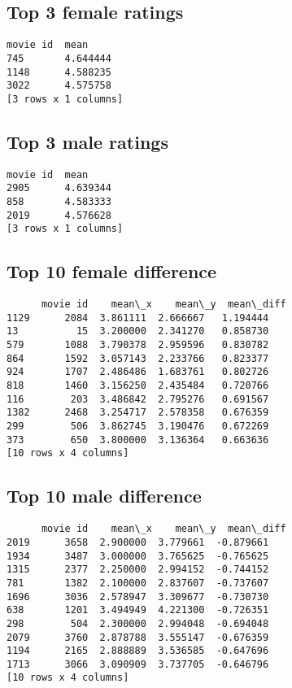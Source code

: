 \documentclass{article}
\begin{document}
\subsection{Top 3 female ratings}

\begin{verbatim}
movie id  mean
745       4.644444
1148      4.588235
3022      4.575758
[3 rows x 1 columns]
\end{verbatim}

\subsection{Top 3 male ratings}

\begin{verbatim}
movie id  mean
2905      4.639344
858       4.583333
2019      4.576628
[3 rows x 1 columns]
\end{verbatim}

\subsection{Top 10 female difference}

\begin{verbatim}
      movie id    mean\_x    mean\_y  mean\_diff
1129      2084  3.861111  2.666667   1.194444
13          15  3.200000  2.341270   0.858730
579       1088  3.790378  2.959596   0.830782
864       1592  3.057143  2.233766   0.823377
924       1707  2.486486  1.683761   0.802726
818       1460  3.156250  2.435484   0.720766
116        203  3.486842  2.795276   0.691567
1382      2468  3.254717  2.578358   0.676359
299        506  3.862745  3.190476   0.672269
373        650  3.800000  3.136364   0.663636
[10 rows x 4 columns]
\end{verbatim}

\subsection{Top 10 male difference}

\begin{verbatim}
      movie id    mean\_x    mean\_y  mean\_diff
2019      3658  2.900000  3.779661  -0.879661
1934      3487  3.000000  3.765625  -0.765625
1315      2377  2.250000  2.994152  -0.744152
781       1382  2.100000  2.837607  -0.737607
1696      3036  2.578947  3.309677  -0.730730
638       1201  3.494949  4.221300  -0.726351
298        504  2.300000  2.994048  -0.694048
2079      3760  2.878788  3.555147  -0.676359
1194      2165  2.888889  3.536585  -0.647696
1713      3066  3.090909  3.737705  -0.646796
[10 rows x 4 columns]
\end{verbatim}
\end{document}
